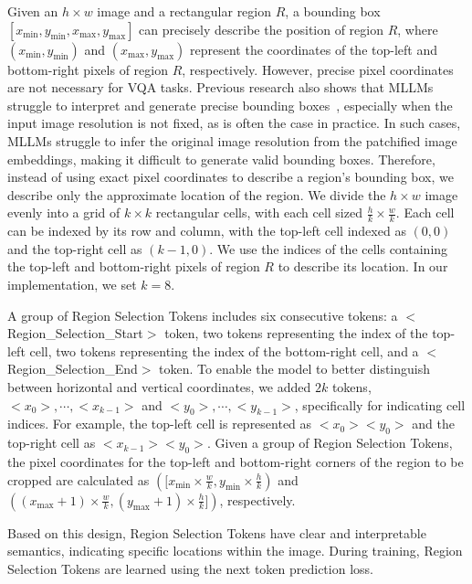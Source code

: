 Given an $h \times w$ image and a rectangular region $R$, a bounding box $[x_{\text{min}}, y_{\text{min}}, x_{\text{max}}, y_{\text{max}}]$ can precisely describe the position of region $R$, where $(x_{\text{min}}, y_{\text{min}})$ and $(x_{\text{max}}, y_{\text{max}})$ represent the coordinates of the top-left and bottom-right pixels of region $R$, respectively. However, precise pixel coordinates are not necessary for VQA tasks. Previous research also shows that MLLMs struggle to interpret and generate precise bounding boxes~\cite{gpt4early}, especially when the input image resolution is not fixed, as is often the case in practice. In such cases, MLLMs struggle to infer the original image resolution from the patchified image embeddings, making it difficult to generate valid bounding boxes.
Therefore, instead of using exact pixel coordinates to describe a region's bounding box, we describe only the approximate location of the region. We divide the $h \times w$ image evenly into a grid of $k \times k$ rectangular cells, with each cell sized $\frac{h}{k} \times \frac{w}{k}$. Each cell can be indexed by its row and column, with the top-left cell indexed as $(0, 0)$ and the top-right cell as $(k-1, 0)$. We use the indices of the cells containing the top-left and bottom-right pixels of region $R$ to describe its location. In our implementation, we set $k=8$.

A group of Region Selection Tokens includes six consecutive tokens: a $<$Region\_Selection\_Start$>$ token, two tokens representing the index of the top-left cell, two tokens representing the index of the bottom-right cell, and a $<$Region\_Selection\_End$>$ token.
To enable the model to better distinguish between horizontal and vertical coordinates, we added $2k$ tokens, $<\!\!x_0\!\!>,\cdots,<\!\!x_{k-1}\!\!>$ and $<\!\!y_0\!\!>,\cdots,<\!\!y_{k-1}\!\!>$, specifically for indicating cell indices. For example, the top-left cell is represented as $<\!\!x_0\!\!><\!\!y_0\!\!>$ and the top-right cell as $<\!\!x_{k-1}\!\!><\!\!y_0\!\!>$.
Given a group of Region Selection Tokens, the pixel coordinates for the top-left and bottom-right corners of the region to be cropped are calculated as $([x_{\text{min}} \times \frac{w}{k}, y_{\text{min}} \times \frac{h}{k})$ and $((x_{\text{max}}+1) \times \frac{w}{k}, (y_{\text{max}}+1) \times \frac{h}{k}])$, respectively. 

Based on this design, Region Selection Tokens have clear and interpretable semantics, indicating specific locations within the image. During training, Region Selection Tokens are learned using the next token prediction loss.

